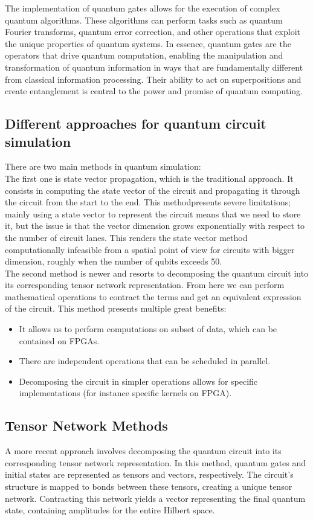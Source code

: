 \documentclass[12pt,oneside,a4paper]{article}
\begin{document}
The implementation of quantum gates allows for the execution of complex quantum algorithms. These algorithms can perform tasks such as quantum Fourier transforms, quantum error correction, and other operations that exploit the unique properties of quantum systems.
In essence, quantum gates are the operators that drive quantum computation, enabling the manipulation and transformation of quantum information in ways that are fundamentally different from classical information processing. Their ability to act on superpositions and create entanglement is central to the power and promise of quantum computing.

\subsection{Different approaches for quantum circuit simulation}
There are two main methods in quantum simulation: \\

The first one is state vector propagation, which is the traditional approach. It consists in computing the state vector of the circuit and propagating it through the circuit from the start to the end. This methodpresents severe limitations; mainly using a state vector to represent the circuit means that we need to store it, but the issue is that the vector dimension grows exponentially with respect to the number of circuit lanes. This renders the state vector method computationally infeasible from a spatial point of view for circuits with bigger dimension, roughly when the number of qubits exceeds 50.\\

The second method is newer and resorts to decomposing the quantum circuit into its corresponding tensor network representation. From here we can perform mathematical operations to contract the terms and get an equivalent expression of the circuit.
This method presents multiple great benefits:
\begin{itemize}
    \item It allows us to perform computations on subset of data, which can be contained on FPGAs.
    \item There are independent operations that can be scheduled in parallel.
    \item Decomposing the circuit in simpler operations allows for specific implementations (for instance specific kernels on FPGA).
\end{itemize}

\subsection{Tensor Network Methods}
A more recent approach involves decomposing the quantum circuit into its corresponding tensor network representation. In this method, quantum gates and initial states are represented as tensors and vectors, respectively. The circuit's structure is mapped to bonds between these tensors, creating a unique tensor network. Contracting this network yields a vector representing the final quantum state, containing amplitudes for the entire Hilbert space.\\
\end{document}

